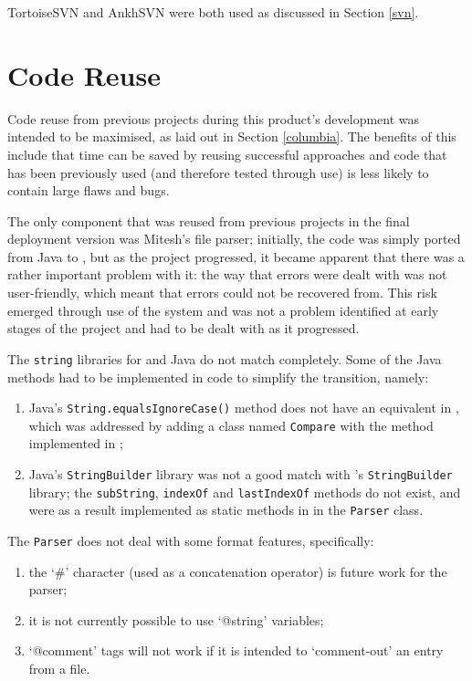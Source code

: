 TortoiseSVN and AnkhSVN were both used as discussed in Section \ref{svn}.

\section{Code Reuse}
\label{codeReuse}
Code reuse from previous projects during this product's development was intended to be maximised, as laid out in Section \ref{columbia}.  The benefits of this include that time can be saved by reusing successful approaches and code that has been previously used (and therefore tested through use) is less likely to contain large flaws and bugs.

The only component that was reused from previous projects in the final deployment version was Mitesh's \bibtex{} file parser;  initially, the code was simply ported from Java to \cs, but as the project progressed, it became apparent that there was a rather important problem with it: the way that errors were dealt with was not user-friendly, which meant that errors could not be recovered from.  This risk emerged through use of the system and was not a problem identified at early stages of the project and had to be dealt with as it progressed.

The \texttt{string} libraries for \cs{} and Java do not match completely.  Some of the Java methods had to be implemented in \cs{} code to simplify the transition, namely:
\begin{enumerate}
	\item Java's \texttt{String.equalsIgnoreCase()} method does not have an equivalent in \cs, which was addressed by adding a class named \texttt{Compare} with the method implemented in \cs;
	\item Java's \texttt{StringBuilder} library was not a good match with \cs's \texttt{StringBuilder} library; the \texttt{subString}, \texttt{indexOf} and \texttt{lastIndexOf} methods do not exist, and were as a result implemented as static methods in \cs{} in the \texttt{Parser} class.
\end{enumerate}

The \texttt{Parser} does not deal with some \bibtex{} format features, specifically:
\begin{enumerate}
	\item the `\#' character (used as a concatenation operator) is future work for the parser;
	\item it is not currently possible to use `@string' variables;
	\item `@comment' tags will not work if it is intended to `comment-out' an entry from a file.
\end{enumerate}
	


